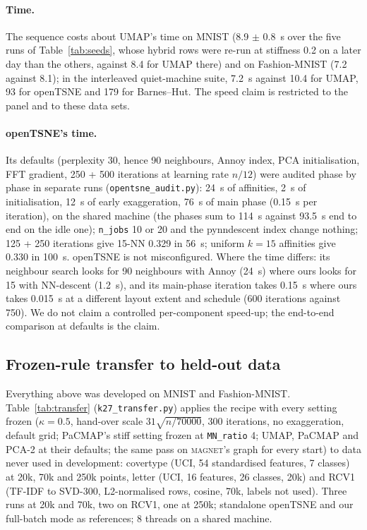 \documentclass[11pt]{article}
\newcommand{\magnet}{\textsc{magnet}}
\begin{document}
\paragraph{Time.} The sequence costs about UMAP's time on MNIST (8.9 $\pm$ 0.8~s over the five runs of Table~\ref{tab:seeds}, whose
hybrid rows were re-run at stiffness 0.2 on a later day than the others, against 8.4 for UMAP there) and on
Fashion-MNIST (7.2 against 8.1); in the interleaved quiet-machine suite, 7.2~s against 10.4 for UMAP, 93 for openTSNE and 179 for Barnes--Hut. The speed claim is restricted to the
panel and to these data sets.

\paragraph{openTSNE's time.} Its defaults (perplexity 30, hence 90 neighbours, Annoy index, PCA
initialisation, FFT gradient, 250 + 500 iterations at learning rate $n / 12$) were audited phase by
phase in separate runs (\texttt{opentsne\_audit.py}): 24~s of affinities, 2~s of initialisation, 12~s
of early exaggeration, 76~s of main phase (0.15~s per iteration), on the shared machine (the phases
sum to 114~s against 93.5~s end to end on the idle one); \texttt{n\_jobs} 10 or 20 and the
pynndescent index change nothing; 125 + 250 iterations give 15-NN 0.329 in 56~s; uniform $k = 15$
affinities give 0.330 in 100~s. openTSNE is not misconfigured. Where the time differs: its neighbour
search looks for 90 neighbours with Annoy (24~s) where ours looks for 15 with NN-descent (1.2~s), and
its main-phase iteration takes 0.15~s where ours takes 0.015~s at a different layout extent and
schedule (600 iterations against 750). We do not claim a controlled per-component speed-up; the
end-to-end comparison at defaults is the claim.

\subsection{Frozen-rule transfer to held-out data}\label{sec:transfer}
Everything above was developed on MNIST and Fashion-MNIST. Table~\ref{tab:transfer}
(\texttt{k27\_transfer.py}) applies the recipe with every setting frozen ($\kappa = 0.5$, hand-over
scale $31\sqrt{n/70000}$, 300 iterations, no exaggeration, default grid; PaCMAP's stiff setting frozen
at \texttt{MN\_ratio} 4; UMAP, PaCMAP and PCA-2 at their defaults; the same pass on \magnet{}'s graph
for every start) to data never used in development: covertype (UCI, 54 standardised features, 7
classes) at 20k, 70k and 250k points, letter (UCI, 16 features, 26 classes, 20k) and RCV1 (TF-IDF to
SVD-300, L2-normalised rows, cosine, 70k, labels not used). Three runs at 20k and 70k, two on RCV1, one
at 250k; standalone openTSNE and our full-batch mode as references; 8 threads on a shared machine.
\end{document}
